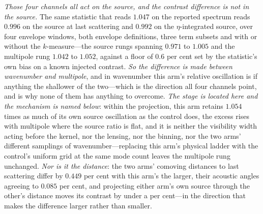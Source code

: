 \documentclass[11pt,a4paper]{article}
\theoremstyle{plain}
\theoremstyle{definition}
\theoremstyle{remark}
\begin{document}
\emph{Those four channels all act on the source, and the contrast difference is not in the source.} The
same statistic that reads $1.047$ on the reported spectrum reads $0.996$ on the source at last scattering
and $0.992$ on the $\eta$-integrated source, over four envelope windows, both envelope definitions, three
term subsets and with or without the $k$-measure---the source rungs spanning $0.971$ to $1.005$ and the
multipole rung $1.042$ to $1.052$, against a floor of $0.6$ per cent set by the statistic's own bias on a
known injected contrast. \emph{So the difference is made between wavenumber and multipole}, and in
wavenumber this arm's relative oscillation is if anything the shallower of the two---which is the direction
all four channels point, and is why none of them has anything to overcome. \emph{The stage is located here
and the mechanism is named below}: within the projection, this arm retains $1.054$ times as much of its own source
oscillation as the control does, the excess rises with multipole where the source ratio is flat, and it is
neither the visibility width acting before the kernel, nor the lensing, nor the binning, nor the two arms'
different samplings of wavenumber---replacing this arm's physical ladder with the control's uniform grid at
the same mode count leaves the multipole rung unchanged. \emph{Nor is it the distance}: the two arms'
comoving distances to last scattering differ by $0.449$ per cent with this arm's the larger, their acoustic
angles agreeing to $0.085$ per cent, and projecting either arm's own source through the other's distance
moves its contrast by under a per cent---in the direction that makes the difference larger rather than
smaller.
\end{document}
